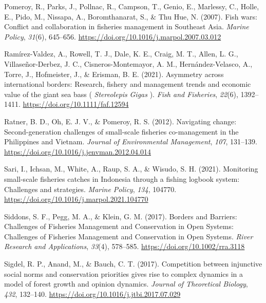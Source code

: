 \documentclass[
  12pt,
]{article}
\newlength{\cslhangindent}
\newenvironment{CSLReferences}[2] %
 {\begin{list}{}{%
  \setlength{\itemindent}{0pt}
  \setlength{\leftmargin}{0pt}
  \setlength{\parsep}{0pt}
  \ifodd #1
   \setlength{\leftmargin}{\cslhangindent}
   \setlength{\itemindent}{-1\cslhangindent}
  \fi
  \setlength{\itemsep}{#2\baselineskip}}}
 {\end{list}}
\begin{document}
\begin{CSLReferences}{1}{2}
Pomeroy, R., Parks, J., Pollnac, R., Campson, T., Genio, E., Marlessy, C., Holle, E., Pido, M., Nissapa, A., Boromthanarat, S., \& Thu Hue, N. (2007). Fish wars: {Conflict} and collaboration in fisheries management in {Southeast Asia}. \emph{Marine Policy}, \emph{31}(6), 645--656. \url{https://doi.org/10.1016/j.marpol.2007.03.012}

Ramírez-Valdez, A., Rowell, T. J., Dale, K. E., Craig, M. T., Allen, L. G., Villaseñor-Derbez, J. C., Cisneros-Montemayor, A. M., Hernández-Velasco, A., Torre, J., Hofmeister, J., \& Erisman, B. E. (2021). Asymmetry across international borders: {Research}, fishery and management trends and economic value of the giant sea bass ( {\emph{Stereolepis}}{ \emph{Gigas}} ). \emph{Fish and Fisheries}, \emph{22}(6), 1392--1411. \url{https://doi.org/10.1111/faf.12594}

Ratner, B. D., Oh, E. J. V., \& Pomeroy, R. S. (2012). Navigating change: {Second-generation} challenges of small-scale fisheries co-management in the {Philippines} and {Vietnam}. \emph{Journal of Environmental Management}, \emph{107}, 131--139. \url{https://doi.org/10.1016/j.jenvman.2012.04.014}

Sari, I., Ichsan, M., White, A., Raup, S. A., \& Wisudo, S. H. (2021). Monitoring small-scale fisheries catches in {Indonesia} through a fishing logbook system: {Challenges} and strategies. \emph{Marine Policy}, \emph{134}, 104770. \url{https://doi.org/10.1016/j.marpol.2021.104770}

Siddons, S. F., Pegg, M. A., \& Klein, G. M. (2017). Borders and {Barriers}: Challenges of {Fisheries Management} and {Conservation} in {Open Systems}: {Challenges} of {Fisheries Management} and {Conservation} in {Open Systems}. \emph{River Research and Applications}, \emph{33}(4), 578--585. \url{https://doi.org/10.1002/rra.3118}

Sigdel, R. P., Anand, M., \& Bauch, C. T. (2017). Competition between injunctive social norms and conservation priorities gives rise to complex dynamics in a model of forest growth and opinion dynamics. \emph{Journal of Theoretical Biology}, \emph{432}, 132--140. \url{https://doi.org/10.1016/j.jtbi.2017.07.029}


\end{CSLReferences}
\end{document}
